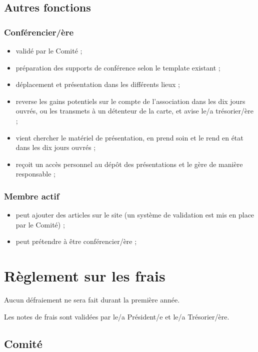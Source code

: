 \documentclass[12pt,twoside]{report}
\begin{document}
\section*{Autres fonctions}

\subsection*{Conférencier/ère}
\begin{itemize}
\item validé par le Comité ;
\item préparation des supports de conférence selon le template existant ;
\item déplacement et présentation dans les différents lieux ;
\item reverse les gains potentiels sur le compte de l’association dans les dix jours ouvrés, ou les transmets à un détenteur de la carte, et avise le/a trésorier/ère ;
\item vient chercher le matériel de présentation, en prend soin et le rend en état dans les dix jours ouvrés ;
\item reçoit un accès personnel au dépôt des présentations et le gère de manière responsable ;
\end{itemize}

\subsection*{Membre actif}
\begin{itemize}
\item peut ajouter des articles sur le site (un système de validation est mis en place par le Comité) ;
\item peut prétendre à être conférencier/ère ;
\end{itemize}

\chapter*{Règlement sur les frais}

Aucun défraiement ne sera fait durant la première année.

Les notes de frais sont validées par le/a Président/e et le/a Trésorier/ère.

\section*{Comité}
\end{document}
